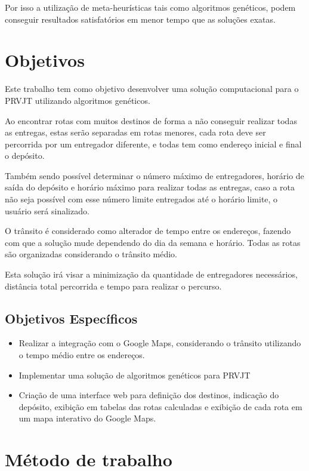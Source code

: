 Por isso a utilização de meta-heurísticas tais como algoritmos genéticos, podem conseguir resultados satisfatórios em menor tempo que as soluções exatas. \cite{BraysyAG}

\section{Objetivos}

Este trabalho tem como objetivo desenvolver uma solução computacional para o PRVJT utilizando algoritmos genéticos.

Ao encontrar rotas com muitos destinos de forma a não conseguir realizar todas as entregas, estas serão separadas em rotas menores, cada rota deve ser percorrida por um entregador diferente, e todas tem como endereço inicial e final o depósito.

Também sendo possível determinar o número máximo de entregadores, horário de saída do depósito e horário máximo para realizar todas as entregas, caso a rota não seja possível com esse número limite entregados até o horário limite, o usuário será sinalizado.

O trânsito é considerado como alterador de tempo entre os endereços, fazendo com que a solução mude dependendo do dia da semana e horário. Todas as rotas são organizadas considerando o trânsito médio.

Esta solução irá visar a minimização da quantidade de entregadores necessários, distância total percorrida e tempo para realizar o percurso.

\subsection{Objetivos Específicos}

\begin{itemize}
	\item Realizar a integração com o Google Maps, considerando o trânsito utilizando o tempo médio entre os endereços.
	\item Implementar uma solução de algoritmos genéticos para PRVJT 
	\item Criação de uma interface web para definição dos destinos, indicação do depósito, exibição em tabelas das rotas calculadas e exibição de cada rota em um mapa interativo do Google Maps.
\end{itemize}


\section{Método de trabalho}

